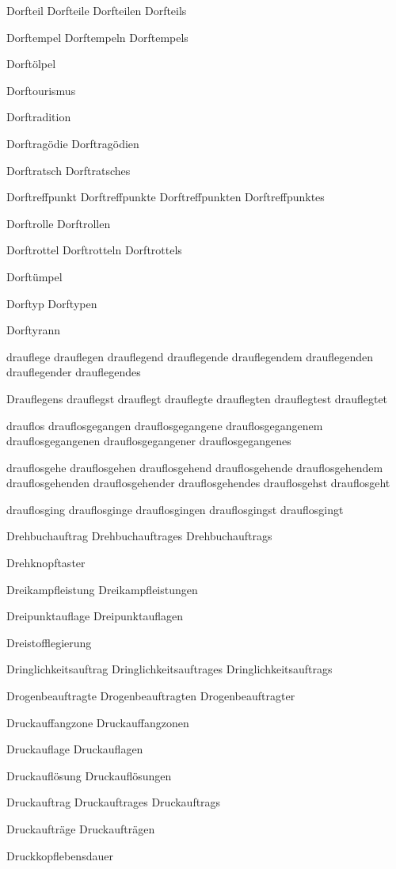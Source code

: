 Dorfteil
Dorfteile
Dorfteilen
Dorfteils

Dorftempel
Dorftempeln
Dorftempels

Dorftölpel

Dorftourismus

Dorftradition

Dorftragödie
Dorftragödien

Dorftratsch
Dorftratsches

Dorftreffpunkt
Dorftreffpunkte
Dorftreffpunkten
Dorftreffpunktes

Dorftrolle
Dorftrollen

Dorftrottel
Dorftrotteln
Dorftrottels

Dorftümpel

Dorftyp
Dorftypen

Dorftyrann

drauflege
drauflegen
drauflegend
drauflegende
drauflegendem
drauflegenden
drauflegender
drauflegendes

Drauflegens
drauflegst
drauflegt
drauflegte
drauflegten
drauflegtest
drauflegtet

drauflos 
drauflosgegangen 
drauflosgegangene 
drauflosgegangenem 
drauflosgegangenen 
drauflosgegangener 
drauflosgegangenes 

drauflosgehe 
drauflosgehen 
drauflosgehend 
drauflosgehende 
drauflosgehendem 
drauflosgehenden 
drauflosgehender 
drauflosgehendes 
drauflosgehst 
drauflosgeht 

drauflosging 
drauflosginge 
drauflosgingen 
drauflosgingst 
drauflosgingt

Drehbuchauftrag
Drehbuchauftrages
Drehbuchauftrags

Drehknopftaster

Dreikampfleistung
Dreikampfleistungen

Dreipunktauflage
Dreipunktauflagen

Dreistofflegierung

Dringlichkeitsauftrag
Dringlichkeitsauftrages
Dringlichkeitsauftrags

Drogenbeauftragte
Drogenbeauftragten
Drogenbeauftragter

Druckauffangzone
Druckauffangzonen

Druckauflage
Druckauflagen

Druckauflösung
Druckauflösungen

Druckauftrag
Druckauftrages
Druckauftrags

Druckaufträge
Druckaufträgen

Druckkopflebensdauer


